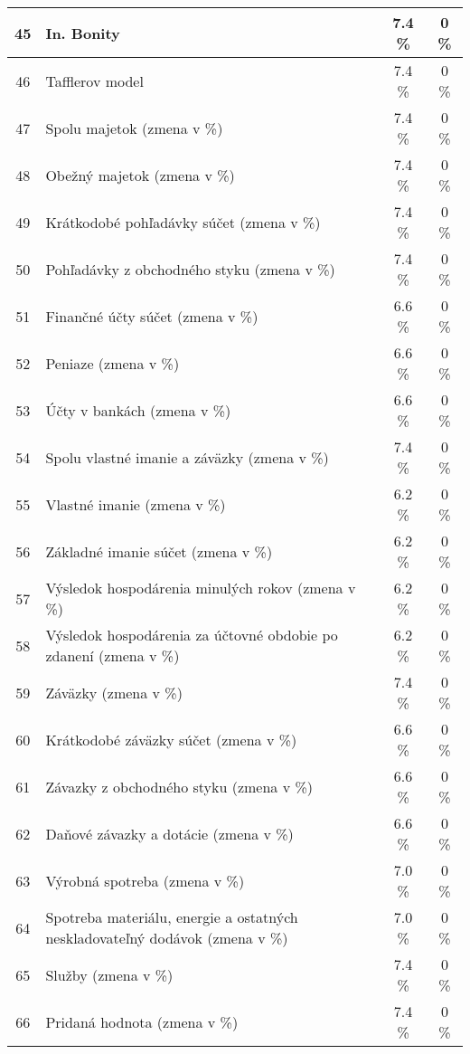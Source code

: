 \begin{longtable}{ |c|p{7cm}|c|c| }
        \hline
        45 & In. Bonity & 7.4 \% & 0 \% \\
        \hline
        46 & Tafflerov model & 7.4 \% & 0 \% \\
        \hline
        47 & Spolu majetok (zmena v \%) & 7.4 \% & 0 \% \\
        \hline
        48 & Obežný majetok (zmena v \%) & 7.4 \% & 0 \% \\
        \hline
        49 & Krátkodobé pohľadávky súčet (zmena v \%) & 7.4 \% & 0 \% \\
        \hline
        50 & Pohľadávky z obchodného styku (zmena v \%) & 7.4 \% & 0 \% \\
        \hline
        51 & Finančné účty súčet (zmena v \%) & 6.6 \% & 0 \% \\
        \hline
        52 & Peniaze (zmena v \%) & 6.6 \% & 0 \% \\
        \hline
        53 & Účty v bankách (zmena v \%) & 6.6 \% & 0 \% \\
        \hline
        54 & Spolu vlastné imanie a záväzky (zmena v \%) & 7.4 \% & 0 \% \\
        \hline
        55 & Vlastné imanie (zmena v \%) & 6.2 \% & 0 \% \\
        \hline
        56 & Základné imanie súčet (zmena v \%) & 6.2 \% & 0 \% \\
        \hline
        57 & Výsledok hospodárenia minulých rokov (zmena v \%) & 6.2 \% & 0 \% \\
        \hline
        58 & Výsledok hospodárenia za účtovné obdobie po zdanení (zmena v \%) & 6.2 \% & 0 \% \\
        \hline
        59 & Záväzky (zmena v \%) & 7.4 \% & 0 \% \\
        \hline
        60 & Krátkodobé záväzky súčet (zmena v \%) & 6.6 \% & 0 \% \\
        \hline
        61 & Závazky z obchodného styku (zmena v \%) & 6.6 \% & 0 \% \\
        \hline
        62 & Daňové závazky a dotácie (zmena v \%) & 6.6 \% & 0 \% \\
        \hline
        63 & Výrobná spotreba (zmena v \%) & 7.0 \% & 0 \% \\
        \hline
        64 & Spotreba materiálu, energie a ostatných neskladovateľný dodávok (zmena v \%) & 7.0 \% & 0 \% \\
        \hline
        65 & Služby (zmena v \%) & 7.4 \% & 0 \% \\
        \hline
        66 & Pridaná hodnota (zmena v \%) & 7.4 \% & 0 \% \\

\end{longtable}
